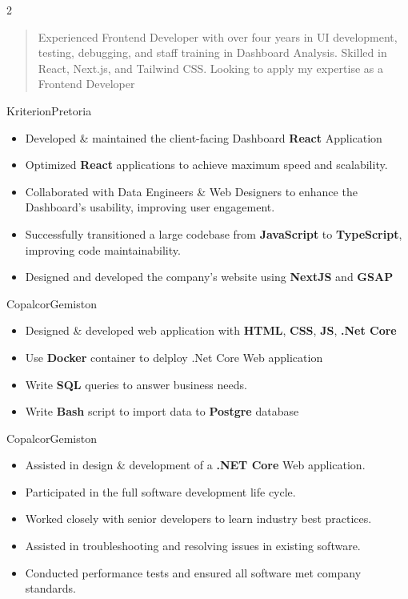 \documentclass[14pt,a4paper,ragged2e,withhyper]{altacv}
\begin{document}
\begin{paracol}{2}



\begin{quote}
    Experienced Frontend Developer with over four years in UI development, testing,
    debugging, and staff training in Dashboard Analysis. Skilled in React, Next.js, and
    Tailwind CSS. Looking to apply my expertise as a Frontend Developer
\end{quote}

    {Kriterion}{Pretoria}
\begin{itemize}
    \item Developed \& maintained the client-facing Dashboard \textbf{React} Application
    \item Optimized \textbf{React} applications to achieve maximum speed and scalability.
    \item Collaborated with Data Engineers \& Web Designers to enhance the Dashboard's
    usability, improving user engagement.
    \item  Successfully transitioned a large codebase from \textbf{JavaScript} to
    \textbf{TypeScript}, improving code maintainability.
    \item  Designed and developed the company's website using \textbf{NextJS}
        and \textbf{GSAP}
\end{itemize}

\divider

        {Copalcor}{Gemiston}
\begin{itemize}
    \item  Designed \& developed web application with \textbf{HTML},
        \textbf{CSS}, \textbf{JS}, \textbf{.Net Core}
    \item  Use \textbf{Docker} container to delploy .Net Core Web application
    \item  Write \textbf{SQL} queries to answer business needs.
    \item  Write \textbf{Bash} script to import data to \textbf{Postgre}
        database
\end{itemize}

\divider

        {Copalcor}{Gemiston}
\begin{itemize}
    \item Assisted in design \& development of a \textbf{.NET Core} Web application.
    \item Participated in the full software development life cycle.
    \item Worked closely with senior developers to learn industry best practices.
    \item Assisted in troubleshooting and resolving issues in existing software.
    \item Conducted performance tests and ensured all software met company standards.
\end{itemize}



\end{paracol}
\end{document}
